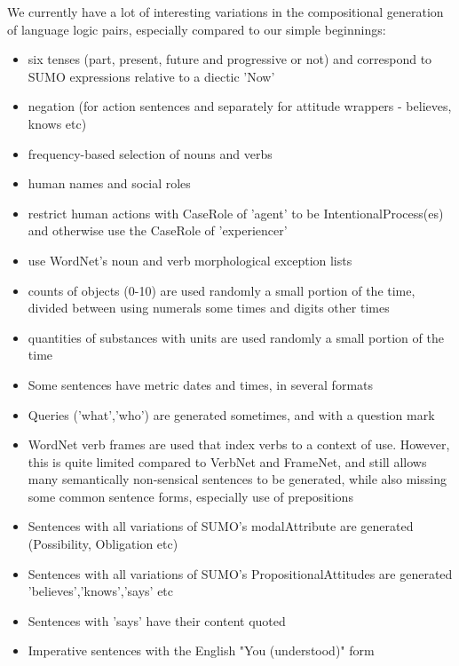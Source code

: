 \documentclass[letterpaper]{article}
\begin{document}
We currently have a lot of interesting variations in the compositional generation of language logic pairs,
especially compared to our simple beginnings:

\begin{itemize}
\item six tenses (part, present, future and progressive or not) and correspond to SUMO expressions relative to a diectic 'Now'
\item  negation (for action sentences and separately for attitude wrappers - believes, knows etc)
\item  frequency-based selection of nouns and verbs
\item  human names and social roles
\item  restrict human actions with CaseRole of 'agent' to be IntentionalProcess(es) and otherwise use the CaseRole of 'experiencer'
\item  use WordNet's noun and verb morphological exception lists
\item  counts of objects (0-10) are used randomly a small portion of the time, divided between using numerals some times and digits other times
\item  quantities of substances with units are used randomly a small portion of the time
\item  Some sentences have metric dates and times, in several formats
\item  Queries ('what','who') are generated sometimes, and with a question mark
\item  WordNet verb frames are used that index verbs to a context of use. However, this is quite limited compared to VerbNet and FrameNet, and still allows many semantically non-sensical sentences to be generated, while also missing some common sentence forms, especially use of prepositions
\item  Sentences with all variations of SUMO's modalAttribute are generated (Possibility, Obligation etc)
\item  Sentences with all variations of SUMO's PropositionalAttitudes are generated 'believes','knows','says' etc
\item  Sentences with 'says' have their content quoted
\item Imperative sentences with the English "You (understood)" form
\end{itemize}



\label{sect:bib}


\end{document}
